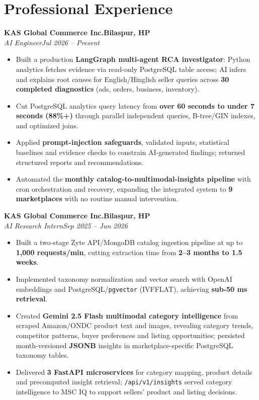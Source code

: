 \documentclass[a4paper,11pt]{article}
\newcommand{\position}[4]{\textbf{#1}\hfill\textbf{#2}\\[-1pt]\textit{#3}\hfill\textit{#4}\vspace{-3pt}}
\newenvironment{tightbullets}{\begin{itemize}[leftmargin=1.25em,label=\textbullet,topsep=2pt,itemsep=2pt,parsep=0pt,partopsep=0pt]}{\end{itemize}\vspace{-4pt}}
\begin{document}
\section{Professional Experience}
\position{KAS Global Commerce Inc.}{Bilaspur, HP}{AI Engineer}{Jul 2026 -- Present}
\begin{tightbullets}
\item Built a production \textbf{LangGraph multi-agent RCA investigator}: Python analytics fetches evidence via read-only PostgreSQL table access; AI infers and explains root causes for English/Hinglish seller queries across \textbf{30 completed diagnostics} (ads, orders, business, inventory).
\item Cut PostgreSQL analytics query latency from \textbf{over 60 seconds to under 7 seconds (88\%+)} through parallel independent queries, B-tree/GIN indexes, and optimized joins.
\item Applied \textbf{prompt-injection safeguards}, validated inputs, statistical baselines and evidence checks to constrain AI-generated findings; returned structured reports and recommendations.
\item Automated the \textbf{monthly catalog-to-multimodal-insights pipeline} with cron orchestration and recovery, expanding the integrated system to \textbf{9 marketplaces} with no routine manual intervention.
\end{tightbullets}
\vspace{2pt}
\position{KAS Global Commerce Inc.}{Bilaspur, HP}{AI Research Intern}{Sep 2025 -- Jun 2026}
\begin{tightbullets}
\item Built a two-stage Zyte API/MongoDB catalog ingestion pipeline at up to \textbf{1,000 requests/min}, cutting extraction time from \textbf{2--3 months to 1.5 weeks}.
\item Implemented taxonomy normalization and vector search with OpenAI embeddings and PostgreSQL/\texttt{pgvector} (IVFFLAT), achieving \textbf{sub-50 ms retrieval}.
\item Created \textbf{Gemini 2.5 Flash multimodal category intelligence} from scraped Amazon/ONDC product text and images, revealing category trends, competitor patterns, buyer preferences and listing opportunities; persisted month-versioned \textbf{JSONB} insights in marketplace-specific PostgreSQL taxonomy tables.
\item Delivered \textbf{3 FastAPI microservices} for category mapping, product details and precomputed insight retrieval; \texttt{/api/v1/insights} served category intelligence to MSC IQ to support sellers' product and listing decisions.
\end{tightbullets}
\end{document}
